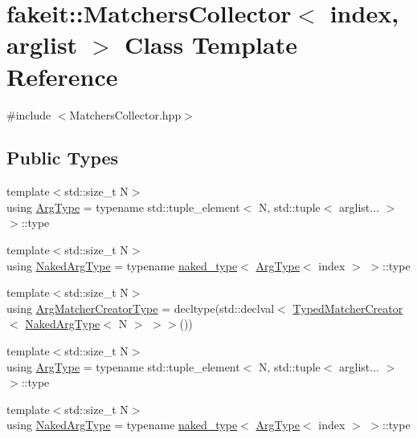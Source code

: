 \hypertarget{classfakeit_1_1MatchersCollector}{}\section{fakeit\+::Matchers\+Collector$<$ index, arglist $>$ Class Template Reference}
\label{classfakeit_1_1MatchersCollector}


{\ttfamily \#include $<$Matchers\+Collector.\+hpp$>$}

\subsection*{Public Types}
\begin{DoxyCompactItemize}
\item 
{\footnotesize template$<$std\+::size\+\_\+t N$>$ }\\using \mbox{\hyperlink{classfakeit_1_1MatchersCollector_aaba0fca8c182a698dda8ca056c29fe5f}{Arg\+Type}} = typename std\+::tuple\+\_\+element$<$ N, std\+::tuple$<$ arglist... $>$ $>$\+::type
\item 
{\footnotesize template$<$std\+::size\+\_\+t N$>$ }\\using \mbox{\hyperlink{classfakeit_1_1MatchersCollector_aeda8ced6a2f0cb7c6e4f916f18a91730}{Naked\+Arg\+Type}} = typename \mbox{\hyperlink{structfakeit_1_1naked__type}{naked\+\_\+type}}$<$ \mbox{\hyperlink{classfakeit_1_1MatchersCollector_aaba0fca8c182a698dda8ca056c29fe5f}{Arg\+Type}}$<$ index $>$ $>$\+::type
\item 
{\footnotesize template$<$std\+::size\+\_\+t N$>$ }\\using \mbox{\hyperlink{classfakeit_1_1MatchersCollector_a1b9d32a66882e0559e7072f1db88eee3}{Arg\+Matcher\+Creator\+Type}} = decltype(std\+::declval$<$ \mbox{\hyperlink{structfakeit_1_1TypedMatcherCreator}{Typed\+Matcher\+Creator}}$<$ \mbox{\hyperlink{classfakeit_1_1MatchersCollector_aeda8ced6a2f0cb7c6e4f916f18a91730}{Naked\+Arg\+Type}}$<$ N $>$ $>$$>$())
\item 
{\footnotesize template$<$std\+::size\+\_\+t N$>$ }\\using \mbox{\hyperlink{classfakeit_1_1MatchersCollector_aaba0fca8c182a698dda8ca056c29fe5f}{Arg\+Type}} = typename std\+::tuple\+\_\+element$<$ N, std\+::tuple$<$ arglist... $>$ $>$\+::type
\item 
{\footnotesize template$<$std\+::size\+\_\+t N$>$ }\\using \mbox{\hyperlink{classfakeit_1_1MatchersCollector_aeda8ced6a2f0cb7c6e4f916f18a91730}{Naked\+Arg\+Type}} = typename \mbox{\hyperlink{structfakeit_1_1naked__type}{naked\+\_\+type}}$<$ \mbox{\hyperlink{classfakeit_1_1MatchersCollector_aaba0fca8c182a698dda8ca056c29fe5f}{Arg\+Type}}$<$ index $>$ $>$\+::type
$$
\end{DoxyCompactItemize}
